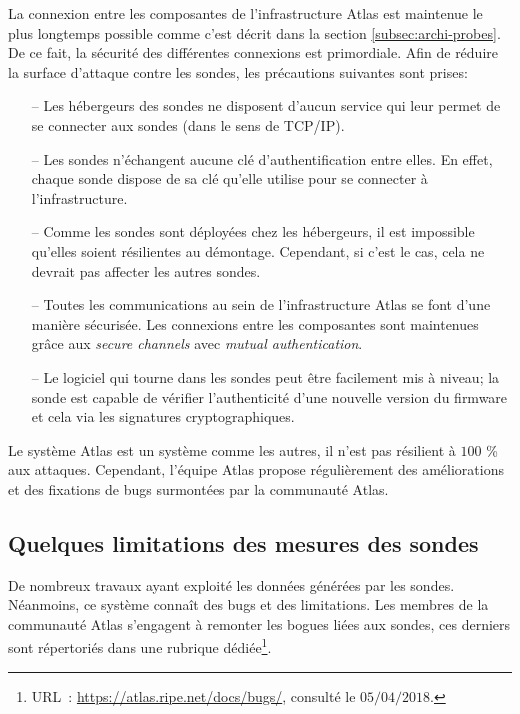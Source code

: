 La connexion entre les composantes de l'infrastructure  Atlas est maintenue le plus longtemps possible comme c'est décrit dans  la section \ref{subsec:archi-probes}. De ce fait, la sécurité des différentes connexions est primordiale. Afin de réduire la surface d'attaque contre les sondes, les précautions suivantes sont prises:

\begin{itemize}
	\item[--] Les  hébergeurs des sondes   ne disposent d'aucun service qui leur permet de se connecter aux sondes (dans le sens de TCP/IP).
	\item[--] Les sondes    n'échangent aucune clé d'authentification entre elles. En effet, chaque sonde dispose de sa clé qu'elle utilise pour se connecter à l'infrastructure.
	\item[--] Comme les sondes   sont  déployées chez  les hébergeurs, il est impossible qu'elles soient résilientes au démontage. Cependant, si c'est le cas, cela ne devrait pas affecter les autres sondes.
	\item[--] Toutes les communications au sein de l'infrastructure  Atlas se font d'une manière sécurisée. Les connexions entre les composantes sont maintenues grâce aux \textit{secure channels} avec \textit{mutual authentication}.
	\item[--] Le logiciel qui tourne dans les sondes   peut être facilement mis à niveau; la sonde   est capable de vérifier l'authenticité d'une nouvelle version du firmware et cela via les signatures cryptographiques. 
\end{itemize}

Le système  Atlas est un système comme les autres, il n'est pas résilient à $100$ \% aux attaques. Cependant, l'équipe  Atlas propose régulièrement des améliorations et des fixations de bugs surmontées par la communauté  Atlas. 


\subsection{Quelques limitations des mesures des sondes}

De nombreux travaux ayant exploité les données générées par les sondes. Néanmoins, ce système connaît des bugs et des limitations. Les membres de la communauté  Atlas s'engagent à remonter les bogues liées aux sondes, ces derniers sont répertoriés dans une rubrique dédiée\footnote{URL~: \url{https://atlas.ripe.net/docs/bugs/}, consulté le $ 05/04/2018 $.}.

